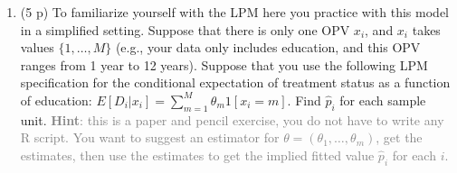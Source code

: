 \documentclass{article}
\begin{document}
\begin{enumerate}[label=\textbf{Q\arabic{enumi}}.,ref=Q\arabic{enumi}, wide=0pt, itemsep=0em, topsep=5pt, labelindent=0pt]
\item (5 p) To familiarize yourself with the LPM here you practice with this model in a simplified setting. Suppose that there is only one OPV $x_i$, and $x_i$ takes values $\{1,\ldots,M\}$ (e.g., your data only includes education, and this OPV ranges from 1 year to 12 years). Suppose that you use the following LPM specification for the conditional expectation of treatment status as a function of education: $E[D_i|x_i]=\sum_{m=1}^{M}\theta_m1[x_i=m]$. Find $\hat{p}_i$ for each sample unit. \textcolor{gray}{\textbf{Hint}: this is a paper and pencil exercise, you do not have to write any R script. You want to suggest an estimator for $\theta=(\theta_1,\ldots,\theta_m)$, get the estimates, then use the estimates to get the implied fitted value $\hat{p}_i$ for each $i$.}


\end{enumerate}
\end{document}
